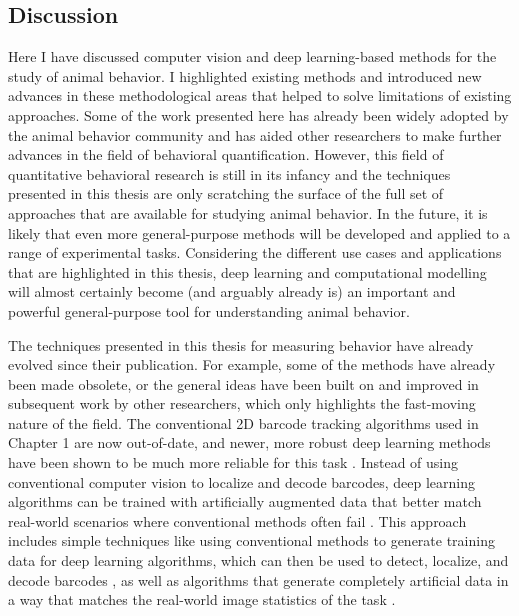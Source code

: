 \documentclass[11pt,a4paper,oneside]{book}
\begin{document}
\begin{doublespace}
\chapter*{Discussion}
Here I have discussed computer vision and deep learning-based methods for the study of animal behavior. I highlighted existing methods and introduced new advances in these methodological areas that helped to solve limitations of existing approaches. Some of the work presented here has already been widely adopted by the animal behavior community and has aided other researchers to make further advances in the field of behavioral quantification. However, this field of quantitative behavioral research is still in its infancy and the techniques presented in this thesis are only scratching the surface of the full set of approaches that are available for studying animal behavior. In the future, it is likely that even more general-purpose methods will be developed and applied to a range of experimental tasks. Considering the different use cases and applications that are highlighted in this thesis, deep learning and computational modelling will almost certainly become (and arguably already is) an important and powerful general-purpose tool for understanding animal behavior. 

The techniques presented in this thesis for measuring behavior have already evolved since their publication. For example, some of the methods have already been made obsolete, or the general ideas have been built on and improved in subsequent work by other researchers, which only highlights the fast-moving nature of the field. The conventional 2D barcode tracking algorithms used in Chapter 1 are now out-of-date, and newer, more robust deep learning methods have been shown to be much more reliable for this task \citep{wild2018honeybee, boenisch2018tracking, sixt2018rendergan, hu2019deep}. Instead of using conventional computer vision to localize and decode barcodes, deep learning algorithms can be trained with artificially augmented data that better match real-world scenarios where conventional methods often fail \citep{sixt2018rendergan}. This approach includes simple techniques like using conventional methods to generate training data for deep learning algorithms, which can then be used to detect, localize, and decode barcodes \citep{hu2019deep}, as well as algorithms that generate completely artificial data in a way that matches the real-world image statistics of the task \citep{sixt2018rendergan}.


\end{doublespace}
\end{document}
